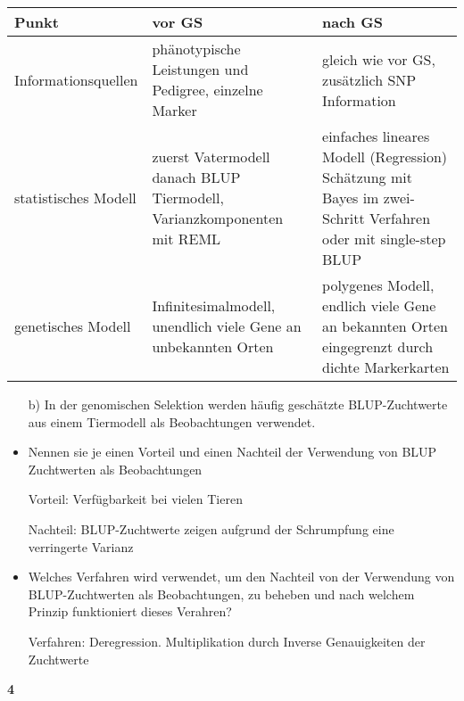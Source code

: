 \documentclass{scrartcl}
\newcommand{\points}[1]
{\begin{flushright}\textbf{#1}\end{flushright}}
\begin{document}
\vspace{5ex}
\begin{tabular}{|l|p{6cm}|p{6cm}|}
\hline
Punkt  &  vor GS  &  nach GS \\
\hline
Informationsquellen   &  ph\"anotypische Leistungen und Pedigree, einzelne Marker
                      &  gleich wie vor GS, zus\"atzlich SNP Information \\ %
\hline
statistisches Modell  &  zuerst Vatermodell danach BLUP Tiermodell, Varianzkomponenten mit REML
                      &  einfaches lineares Modell (Regression) Sch\"atzung mit Bayes im zwei-Schritt Verfahren oder mit single-step BLUP \\ %
\hline
genetisches Modell    &  Infinitesimalmodell, unendlich viele Gene an unbekannten Orten
                      &  polygenes Modell, endlich viele Gene an bekannten Orten eingegrenzt durch dichte Markerkarten \\ %
\hline
\end{tabular}

\clearpage
\pagebreak

\begin{enumerate}
\item[b)] In der genomischen Selektion werden h\"aufig gesch\"atzte BLUP-Zuchtwerte aus einem Tiermodell als Beobachtungen verwendet.
\end{enumerate}

\begin{itemize}
\item Nennen sie je einen Vorteil und einen Nachteil der Verwendung von BLUP Zuchtwerten als Beobachtungen

Vorteil: Verf\"ugbarkeit bei vielen Tieren

Nachteil:  BLUP-Zuchtwerte zeigen aufgrund der Schrumpfung eine verringerte Varianz

\item Welches Verfahren wird verwendet, um den Nachteil von der Verwendung von BLUP-Zuchtwerten als Beobachtungen, zu beheben und nach welchem Prinzip funktioniert dieses Verahren?

Verfahren: Deregression. Multiplikation durch Inverse Genauigkeiten der Zuchtwerte

\end{itemize}
\points{4}
\end{document}
